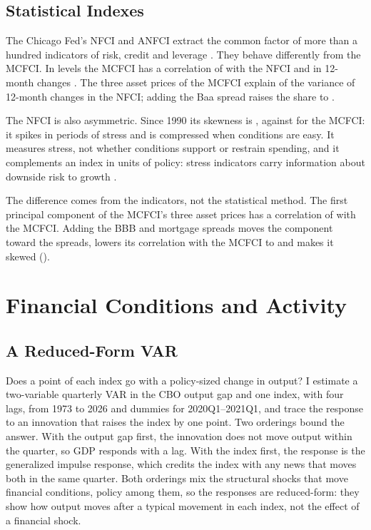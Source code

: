 \documentclass[11pt]{article}
\begin{document}
\subsection{Statistical Indexes}\label{sec:stat}
The Chicago Fed's NFCI and ANFCI extract the common factor of more than a hundred indicators of risk, credit and leverage \citep{brave2011}. They behave differently from the MCFCI. In levels the MCFCI has a correlation of  with the NFCI and in 12-month changes . The three asset prices of the MCFCI explain  of the variance of 12-month changes in the NFCI; adding the Baa spread raises the share to .

The NFCI is also asymmetric. Since 1990 its skewness is , against  for the MCFCI: it spikes in periods of stress and is compressed when conditions are easy. It measures stress, not whether conditions support or restrain spending, and it complements an index in units of policy: stress indicators carry information about downside risk to growth \citep{adrian2019}.

The difference comes from the indicators, not the statistical method. The first principal component of the MCFCI's three asset prices has a correlation of  with the MCFCI. Adding the BBB and mortgage spreads moves the component toward the spreads, lowers its correlation with the MCFCI to  and makes it skewed ().

\section{Financial Conditions and Activity}\label{sec:activity}
\subsection{A Reduced-Form VAR}\label{sec:var}
Does a point of each index go with a policy-sized change in output? I estimate a two-variable quarterly VAR in the CBO output gap and one index, with four lags, from 1973 to 2026 and dummies for 2020Q1--2021Q1, and trace the response to an innovation that raises the index by one point. Two orderings bound the answer. With the output gap first, the innovation does not move output within the quarter, so GDP responds with a lag. With the index first, the response is the generalized impulse response, which credits the index with any news that moves both in the same quarter. Both orderings mix the structural shocks that move financial conditions, policy among them, so the responses are reduced-form: they show how output moves after a typical movement in each index, not the effect of a financial shock.
\end{document}
